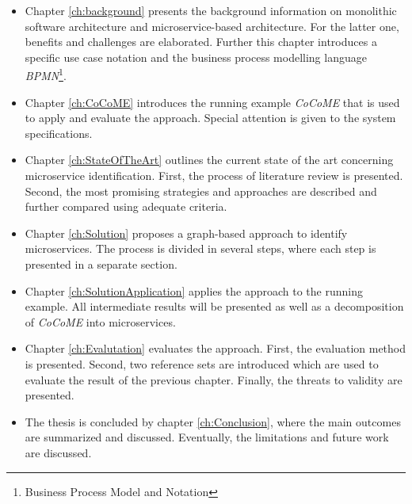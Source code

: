 \begin{itemize}
	\item  Chapter \ref{ch:background} presents the background information on monolithic software architecture and microservice-based architecture. For the latter one, benefits and challenges are elaborated. Further this chapter introduces a specific use case notation and the business process modelling language \textit{BPMN}\footnote{Business Process Model and Notation}.
	\item Chapter \ref{ch:CoCoME} introduces the running example \textit{CoCoME} that is used to apply and evaluate the approach. Special attention is given to the system specifications.
	\item Chapter \ref{ch:StateOfTheArt} outlines the current state of the art concerning microservice identification. First, the process of literature review is presented. Second, the most promising strategies and approaches are described and further compared using adequate criteria.
	\item Chapter \ref{ch:Solution} proposes a graph-based approach to identify microservices. The process is divided in several steps, where each step is presented in a separate section.
	\item Chapter \ref{ch:SolutionApplication} applies the approach to the running example. All intermediate results will be presented as well as a decomposition of \textit{CoCoME} into microservices.
    \item Chapter \ref{ch:Evalutation} evaluates the approach. First, the evaluation method is presented. Second, two reference sets are introduced which are used to evaluate the result of the previous chapter. Finally, the threats to validity are presented.
    \item The thesis is concluded by chapter \ref{ch:Conclusion}, where the main outcomes are summarized and discussed. Eventually, the limitations and future work are discussed.
    

\end{itemize}











